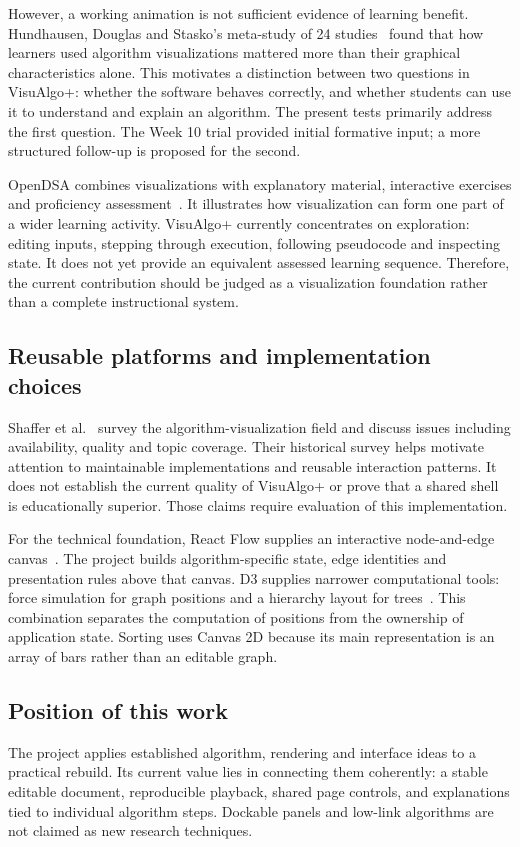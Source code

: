 \documentclass[11pt,a4paper]{article}
\begin{document}
However, a working animation is not sufficient evidence of learning benefit. Hundhausen, Douglas and Stasko's meta-study of 24 studies~\cite{hundhausen2002} found that how learners used algorithm visualizations mattered more than their graphical characteristics alone. This motivates a distinction between two questions in VisuAlgo+: whether the software behaves correctly, and whether students can use it to understand and explain an algorithm. The present tests primarily address the first question. The Week 10 trial provided initial formative input; a more structured follow-up is proposed for the second.

OpenDSA combines visualizations with explanatory material, interactive exercises and proficiency assessment~\cite{opendsa}. It illustrates how visualization can form one part of a wider learning activity. VisuAlgo+ currently concentrates on exploration: editing inputs, stepping through execution, following pseudocode and inspecting state. It does not yet provide an equivalent assessed learning sequence. Therefore, the current contribution should be judged as a visualization foundation rather than a complete instructional system.

\subsection{Reusable platforms and implementation choices}
Shaffer et al.~\cite{shaffer2010} survey the algorithm-visualization field and discuss issues including availability, quality and topic coverage. Their historical survey helps motivate attention to maintainable implementations and reusable interaction patterns. It does not establish the current quality of VisuAlgo+ or prove that a shared shell is educationally superior. Those claims require evaluation of this implementation.

For the technical foundation, React Flow supplies an interactive node-and-edge canvas~\cite{reactflow}. The project builds algorithm-specific state, edge identities and presentation rules above that canvas. D3 supplies narrower computational tools: force simulation for graph positions and a hierarchy layout for trees~\cite{d3}. This combination separates the computation of positions from the ownership of application state. Sorting uses Canvas 2D because its main representation is an array of bars rather than an editable graph.

\subsection{Position of this work}
The project applies established algorithm, rendering and interface ideas to a practical rebuild. Its current value lies in connecting them coherently: a stable editable document, reproducible playback, shared page controls, and explanations tied to individual algorithm steps. Dockable panels and low-link algorithms are not claimed as new research techniques.
\end{document}
